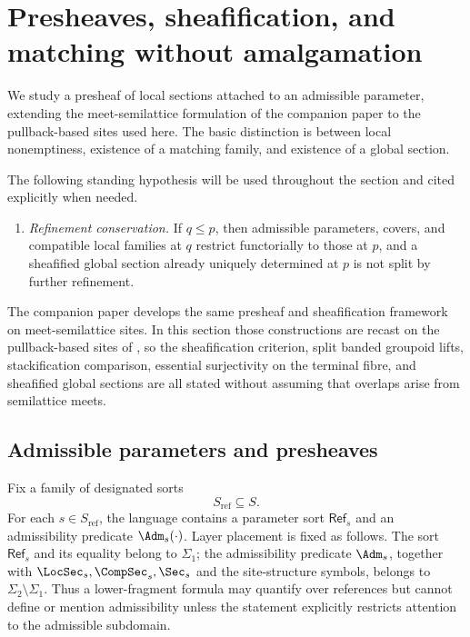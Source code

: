 \section{Presheaves, sheafification, and matching without amalgamation}\label{sec:null-decomposition}

We study a presheaf of local sections attached to an admissible parameter, extending the meet-semilattice formulation of the companion paper \cite{MaZhang2026ConditionalGluingFailure} to the pullback-based sites used here. The basic distinction is between local nonemptiness, existence of a matching family, and existence of a global section.

The following standing hypothesis will be used throughout the section and cited explicitly when needed.

\begin{enumerate}[label=\textup{(RC)},nosep,leftmargin=3em]
\item\label{hyp:refinement-conservation} \emph{Refinement conservation.} If $q\le p$, then admissible parameters, covers, and compatible local families at $q$ restrict functorially to those at $p$, and a sheafified global section already uniquely determined at $p$ is not split by further refinement.
\end{enumerate}

\begin{remark}
The companion paper \cite{MaZhang2026ConditionalGluingFailure} develops the same presheaf and sheafification framework on meet-semilattice sites. In this section those constructions are recast on the pullback-based sites of , so the sheafification criterion, split banded groupoid lifts, stackification comparison, essential surjectivity on the terminal fibre, and sheafified global sections are all stated without assuming that overlaps arise from semilattice meets.
\end{remark}

\subsection{Admissible parameters and presheaves}

Fix a family of designated sorts
\[
S_{\mathrm{ref}}\subseteq S.
\]
For each $s\in S_{\mathrm{ref}}$, the language contains a parameter sort $\mathsf{Ref}_s$ and an admissibility predicate $\Adm_s(\cdot)$.
Layer placement is fixed as follows. The sort \(\mathsf{Ref}_s\) and its
equality belong to \(\Sigma_1\); the admissibility predicate
\(\Adm_s\), together with \(\LocSec_s,\CompSec_s,\Sec_s\) and the
site-structure symbols, belongs to \(\Sigma_2\setminus\Sigma_1\). Thus a
lower-fragment formula may quantify over references but cannot define or
mention admissibility unless the statement explicitly restricts attention to the
admissible subdomain.

